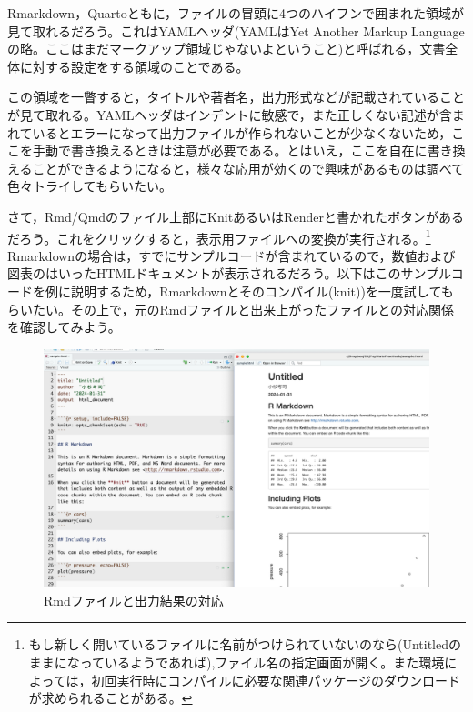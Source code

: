 \documentclass[
  a4paper,
]{ltjsbook}
\begin{document}
Rmarkdown，Quartoともに，ファイルの冒頭に4つのハイフンで囲まれた領域が見て取れるだろう。これはYAMLヘッダ(YAMLはYet
Another Markup
Languageの略。ここはまだマークアップ領域じゃないよということ)と呼ばれる，文書全体に対する設定をする領域のことである。

この領域を一瞥すると，タイトルや著者名，出力形式などが記載されていることが見て取れる。YAMLヘッダはインデントに敏感で，また正しくない記述が含まれているとエラーになって出力ファイルが作られないことが少なくないため，ここを手動で書き換えるときは注意が必要である。とはいえ，ここを自在に書き換えることができるようになると，様々な応用が効くので興味があるものは調べて色々トライしてもらいたい。

さて，Rmd/Qmdのファイル上部にKnitあるいはRenderと書かれたボタンがあるだろう。これをクリックすると，表示用ファイルへの変換が実行される。\footnote{もし新しく開いているファイルに名前がつけられていないのなら(Untitledのままになっているようであれば),ファイル名の指定画面が開く。また環境によっては，初回実行時にコンパイルに必要な関連パッケージのダウンロードが求められることがある。}
Rmarkdownの場合は，すでにサンプルコードが含まれているので，数値および図表のはいったHTMLドキュメントが表示されるだろう。以下はこのサンプルコードを例に説明するため，Rmarkdownとそのコンパイル(knit))を一度試してもらいたい。その上で，元のRmdファイルと出来上がったファイルとの対応関係を確認してみよう。

\begin{figure}[H]

{\centering \includegraphics{../common/images/04_coresspRmd.png}

}

\caption{Rmdファイルと出力結果の対応}

\end{figure}%
\end{document}
